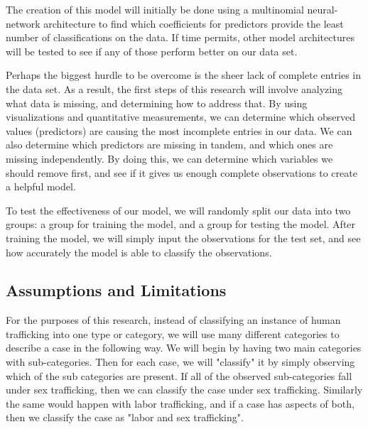 \documentclass{article} %
\begin{document}
The creation of this model will initially be done using a multinomial neural-network architecture to find which coefficients for predictors provide the least number of classifications on the data. If time permits, other model architectures will be tested to see if any of those perform better on our data set.


Perhaps the biggest hurdle to be overcome is the sheer lack of complete entries in the data set. As a result, the first steps of this research will involve analyzing what data is missing, and determining how to address that. By using visualizations and quantitative measurements, we can determine which observed values (predictors) are causing the most incomplete entries in our data. We can also determine which predictors are missing in tandem, and which ones are missing independently. By doing this, we can determine which variables we should remove first, and see if it gives us enough complete observations to create a helpful model.

To test the effectiveness of our model, we will randomly split our data into two groups: a group for training the model, and a group for testing the model. After training the model, we will simply input the observations for the test set, and see how accurately the model is able to classify the observations.

\subsection{Assumptions and Limitations}


For the purposes of this research, instead of classifying an instance of human trafficking into one type or category, we will use many different categories to describe a case in the following way. We will begin by having two main categories with sub-categories. Then for each case, we will "classify" it by simply observing which of the sub categories are present. If all of the observed sub-categories fall under sex trafficking, then we can classify the case under sex trafficking. Similarly the same would happen with labor trafficking, and if a case has aspects of both, then we classify the case as "labor and sex trafficking".
\end{document}

